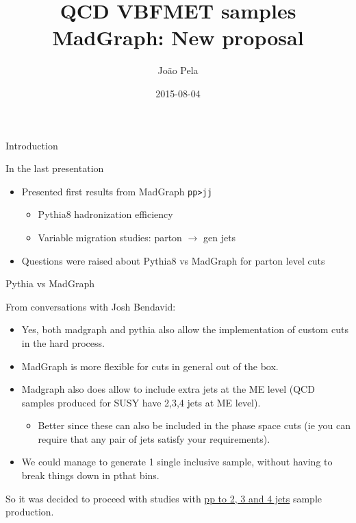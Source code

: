 \documentclass[8pt]{beamer}
\author[J. Pela]{João Pela}
\title{QCD VBFMET samples MadGraph: New proposal}
\institute[ICL]{Imperial College London}
\date{2015-08-04}
\begin{document}
\setlength{\unitlength}{1mm}

\begin{frame}
  \titlepage
\end{frame}

\begin{frame}{Introduction}

\begin{block}{In the last presentation}
  
\begin{itemize}
  \item Presented first results from MadGraph \texttt{pp>jj}
  \begin{itemize}
    \item Pythia8 hadronization efficiency
    \item Variable migration studies: parton $\rightarrow$ gen jets
  \end{itemize}
  \item Questions were raised about Pythia8 vs MadGraph for parton level cuts
\end{itemize}

\end{block}

\begin{block}{Pythia vs MadGraph}

From conversations with Josh Bendavid:

\begin{itemize}
  \item Yes, both madgraph and pythia also allow the implementation of custom cuts in the hard process.
  \item MadGraph is more flexible for cuts in general out of the box.
  \item Madgraph also does allow to include extra jets at the ME level (QCD samples produced for SUSY have 2,3,4 jets at ME level). 
  \begin{itemize}
    \item Better since these can also be included in the phase space cuts (ie you can require that any pair of jets satisfy your requirements).
  \end{itemize}
  \item We could manage to generate 1 single inclusive sample, without having to break things down in pthat bins.
\end{itemize}

\end{block}

\begin{center}
  So it was decided to proceed with studies with \uline{pp to 2, 3 and 4 jets} sample production.
\end{center}


\end{frame}
\end{document}
